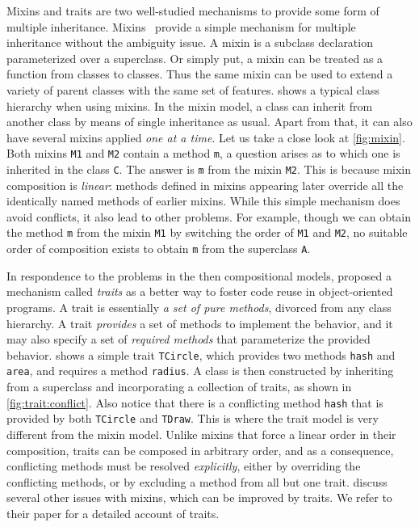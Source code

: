 Mixins and traits are two well-studied mechanisms to provide some form of
multiple inheritance. Mixins~\citep{bracha1990mixin} provide a simple mechanism
for multiple inheritance without the ambiguity issue. A mixin is a subclass
declaration parameterized over a superclass. Or simply put, a mixin can be
treated as a function from classes to classes. Thus the same mixin can be used to
extend a variety of parent classes with the same set of features.
 shows a typical class hierarchy when using mixins. In the mixin
model, a class can inherit from another class by means of single inheritance as
usual. Apart from that, it can also have several mixins applied \textit{one at a
  time}. Let us take a close look at \cref{fig:mixin}. Both mixins
\lstinline{M1} and \lstinline{M2} contain a method \lstinline{m}, a question
arises as to which one is inherited in the class \lstinline{C}. The answer is
\lstinline{m} from the mixin \lstinline{M2}. This is because mixin composition
is \textit{linear}: methods defined in mixins appearing later override all the
identically named methods of earlier mixins. While this simple mechanism does
avoid conflicts, it also lead to other problems. For example, though we can
obtain the method \lstinline{m} from the mixin \lstinline{M1} by switching the
order of \lstinline{M1} and \lstinline{M2}, no suitable order of composition
exists to obtain \lstinline{m} from the superclass \lstinline{A}.

In respondence to the problems in the then compositional models,
\citet{scharli2003traits} proposed a mechanism called \textit{traits} as a
better way to foster code reuse in object-oriented programs. A trait is
essentially \textit{a set of pure methods}, divorced from any class hierarchy. A
trait \textit{provides} a set of methods to implement the behavior, and it may
also specify a set of \textit{required methods} that parameterize the provided
behavior.  shows a simple trait \lstinline{TCircle}, which
provides two methods \lstinline{hash} and \lstinline{area}, and requires a
method \lstinline{radius}. A class is then constructed by inheriting from a
superclass and incorporating a collection of traits, as shown in
\cref{fig:trait:conflict}. Also notice that there is a conflicting method
\lstinline{hash} that is provided by both \lstinline{TCircle} and
\lstinline{TDraw}. This is where the trait model is very different from the
mixin model. Unlike mixins that force a linear order in their composition,
traits can be composed in arbitrary order, and as a consequence, conflicting
methods must be resolved \textit{explicitly}, either by overriding the
conflicting methods, or by excluding a method from all but one trait.
\citet{scharli2003traits} discuss several other issues with mixins, which can be
improved by traits. We refer to their paper for a detailed account of traits.


